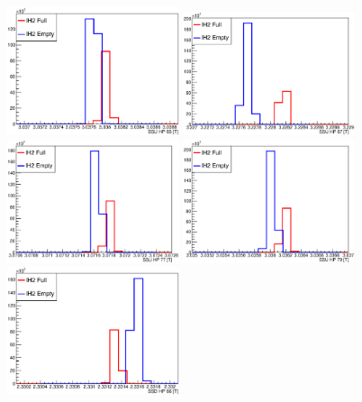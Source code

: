 \begin{figure}[!tbh]
    \centering
    \includegraphics*[width=0.45\textwidth]{03-Detectors/Figures/HallProbes/hp_65.eps}
    \includegraphics*[width=0.45\textwidth]{03-Detectors/Figures/HallProbes/hp_67.eps}
    \includegraphics*[width=0.45\textwidth]{03-Detectors/Figures/HallProbes/hp_77.eps}
    \includegraphics*[width=0.45\textwidth]{03-Detectors/Figures/HallProbes/hp_79.eps}
    \includegraphics*[width=0.45\textwidth]{03-Detectors/Figures/HallProbes/hp_66.eps}

\end{figure}
